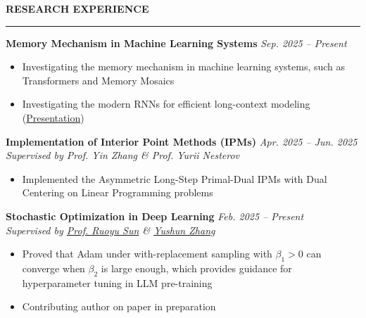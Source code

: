 \documentclass[10pt]{extarticle}
\newlength{\titlelength}
\newcommand{\customsection}[1]{
  \vspace{0.4em}%
  \settowidth{\titlelength}{\color{sectioncolor}\Large\bfseries\uppercase{#1}}
  {\color{sectioncolor}\Large\bfseries\uppercase{#1}} 
  {\color{sectioncolor}\rule[0.5ex]{\linewidth-\titlelength-0em}{0.5pt}}\par\vspace{0.2em}%
}
\begin{document}
\customsection{Research Experience}
\textbf{Memory Mechanism in Machine Learning Systems} \hfill \textit{Sep. 2025 -- Present}
\textit{}
\begin{itemize}[leftmargin=1em, label=$\bullet$, nosep, topsep=0pt]
  \item Investigating the memory mechanism in machine learning systems, such as Transformers and Memory Mosaics
  \item Investigating the modern RNNs for efficient long-context modeling (\href{https://bingran-li.github.io/blog/notes/Memory%20Problems%20In%20AI.html}{Presentation})
\end{itemize}

\textbf{Implementation of Interior Point Methods (IPMs)} \hfill \textit{Apr. 2025 -- Jun. 2025}\\
\textit{Supervised by Prof. Yin Zhang \& Prof. Yurii Nesterov}
\begin{itemize}[leftmargin=1em, label=$\bullet$, nosep, topsep=0pt]
  \item Implemented the Asymmetric Long-Step Primal-Dual IPMs with Dual Centering on Linear Programming problems %
\end{itemize}

\textbf{Stochastic Optimization in Deep Learning} \hfill \textit{Feb. 2025 -- Present}\\
\textit{Supervised by \href{https://ruoyus.github.io/}{Prof. Ruoyu Sun} \& \href{https://zyushun.github.io/}{Yushun Zhang}}
\begin{itemize}[leftmargin=1em, label=$\bullet$, nosep, topsep=0pt]
  \item Proved that Adam under with-replacement sampling with $\beta_1>0$ can converge when $\beta_2$ is large enough, which provides guidance for hyperparameter tuning in LLM pre-training
  \item Contributing author on paper in preparation
\end{itemize}

\end{document}

